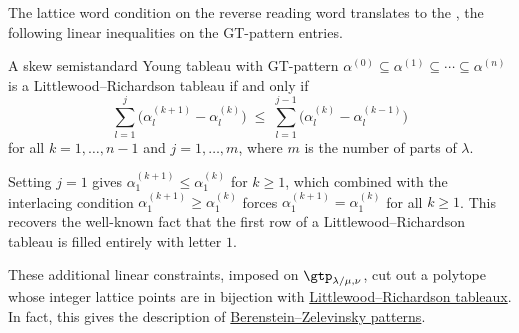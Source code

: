 The lattice word condition on the reverse reading word translates to the
\label{yamanouchiInequalities}, the following
linear inequalities on the GT-pattern entries.

\begin{proposition}
A skew semistandard Young tableau with GT-pattern
$\alpha^{(0)} \subseteq \alpha^{(1)} \subseteq \dotsb \subseteq \alpha^{(n)}$
is a Littlewood--Richardson tableau if and only if
\begin{equation*}
\sum_{l=1}^{j} \bigl(\alpha^{(k+1)}_l - \alpha^{(k)}_l\bigr)
\;\leq\;
\sum_{l=1}^{j-1} \bigl(\alpha^{(k)}_l - \alpha^{(k-1)}_l\bigr)
\end{equation*}
for all $k = 1, \dotsc, n-1$ and $j = 1, \dotsc, m$,
where $m$ is the number of parts of $\lambda$.
\end{proposition}

Setting $j=1$ gives $\alpha^{(k+1)}_1 \leq \alpha^{(k)}_1$ for $k \geq 1$,
which combined with the interlacing condition
$\alpha^{(k+1)}_1 \geq \alpha^{(k)}_1$
forces $\alpha^{(k+1)}_1 = \alpha^{(k)}_1$ for all $k \geq 1$.
This recovers the well-known fact that the first row of a
Littlewood--Richardson tableau is filled entirely with letter $1$.

These additional linear constraints, imposed on $\gtp_{\lambda/\mu,\nu}$,
cut out a polytope whose integer lattice points are in bijection with
\hyperref[lrTableaux]{Littlewood--Richardson tableaux}.  In fact, this gives
the description of \hyperref[bzPatterns]{Berenstein--Zelevinsky patterns}.



